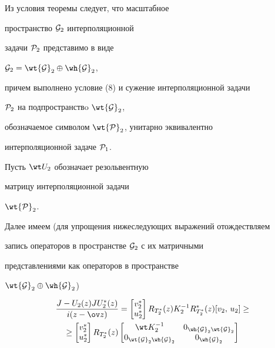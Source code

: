 \begin{pf}


Из условия теоремы следует, что масштабное


пространство ${\cal G}_2$ интерполяционной


задачи ${\cal P}_2$ представимо в виде


${\cal G}_2=\wt {\cal G}_2 \oplus \wh {\cal G}_2$,


причем выполнено условие (8) и сужение интерполяционной задачи


${\cal P}_2$ на подпространствo $\wt {\cal G}_2$,


обозначаемое символом $\wt {\cal P}_2$, унитарно эквивалентно


интерполяционной задаче ${\cal P}_1$.


Пусть $\wt U_2 $ обозначает резольвентную


матрицу интерполяционной задачи


$\wt {\cal P}_2$.





Далее имеем (для упрощения нижеследующих выражений отождествляем


запись операторов в пространстве ${\cal G}_2 $ с их матричными


представлениями как операторов в пространстве


$\wt {\cal G}_2 \oplus \wh {\cal G}_2 $)


\begin{gather*}


\frac{J-U_2(z)JU_2^*(z)}{i(z-\ov z)}


= \begin{bmatrix} v_2^* \\ u_2^* \end{bmatrix}R_{T_2^*}(z)


K_2^{-1}R_{T_2^*}^*(z)[v_2,\, u_2]\ge \\


%


\ge \begin{bmatrix} v_2^* \\ u_2^* \end{bmatrix} R_{T_2^*}(z)


\begin{bmatrix}


\wt K_2^{-1} & 0_{\wh {\cal G}_2 \wt {\cal G}_2} \\


0_{\wt {\cal G}_2 \wh {\cal G}_2} & 0_{\wh {\cal G}_2}



\end{bmatrix}
\end{gather*}
\end{pf}
